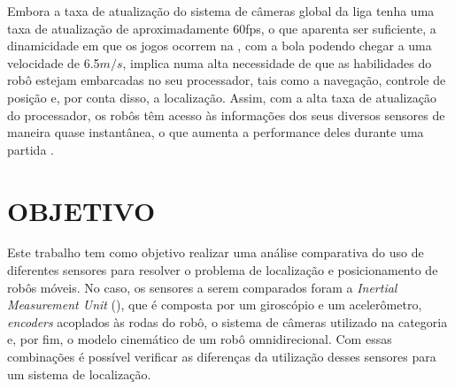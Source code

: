 \documentclass[acronym, symbols, table]{fei}
\begin{document}
	Embora a taxa de atualização do sistema de câmeras global da liga tenha uma taxa de atualização de aproximadamente 60fps, o que aparenta ser suficiente, a dinamicidade em que os jogos ocorrem na , com a bola podendo chegar a uma velocidade de 6.5$m/s$, implica numa alta necessidade de que as habilidades do robô estejam embarcadas no seu processador, tais como a navegação, controle de posição e, por conta disso, a localização. Assim, com a alta taxa de atualização do processador, os robôs têm acesso às informações dos seus diversos sensores de maneira quase instantânea, o que aumenta a performance deles durante uma partida \cite{ubc_thunderbots_2015}.

%	
	

%	
	
	\section{OBJETIVO}
	
		Este trabalho tem como objetivo realizar uma análise comparativa do uso de diferentes sensores para resolver o problema de localização e posicionamento de robôs móveis. No caso, os sensores a serem comparados foram a \textit{Inertial Measurement Unit} (), que é composta por um giroscópio e um acelerômetro, \textit{encoders} acoplados às rodas do robô, o sistema de câmeras utilizado na categoria  e, por fim, o modelo cinemático de um robô omnidirecional. Com essas combinações é possível verificar as diferenças da utilização desses sensores para um sistema de localização.
	
\end{document}
